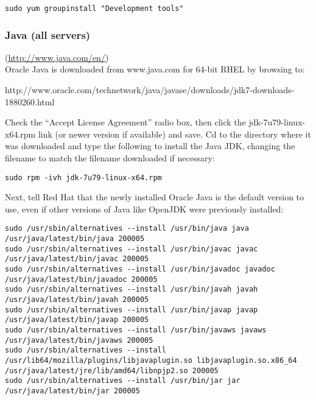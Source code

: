 \begin{verbatim}
sudo yum groupinstall "Development tools"
\end{verbatim}

\subsubsection{Java (all servers)} (\url{http://www.java.com/en/})\\
Oracle Java is downloaded from www.java.com for 64-bit RHEL by browsing to:

http://www.oracle.com/technetwork/java/javase/downloads/jdk7-downloads-1880260.html

Check the ``Accept License Agreement'' radio box, then click the
jdk-7u79-linux-x64.rpm link (or newer version if available) and save.
Cd to the directory where it was downloaded and type the following to install
the Java JDK, changing the filename to match the filename downloaded
if necessary:

\begin{verbatim}
sudo rpm -ivh jdk-7u79-linux-x64.rpm
\end{verbatim}

Next, tell Red Hat that the newly installed Oracle Java is the default
version to use, even if other versions of Java like OpenJDK were
previously installed:

\begin{verbatim}
sudo /usr/sbin/alternatives --install /usr/bin/java java /usr/java/latest/bin/java 200005 
sudo /usr/sbin/alternatives --install /usr/bin/javac javac /usr/java/latest/bin/javac 200005
sudo /usr/sbin/alternatives --install /usr/bin/javadoc javadoc /usr/java/latest/bin/javadoc 200005
sudo /usr/sbin/alternatives --install /usr/bin/javah javah /usr/java/latest/bin/javah 200005 
sudo /usr/sbin/alternatives --install /usr/bin/javap javap /usr/java/latest/bin/javap 200005 
sudo /usr/sbin/alternatives --install /usr/bin/javaws javaws /usr/java/latest/bin/javaws 200005 
sudo /usr/sbin/alternatives --install /usr/lib64/mozilla/plugins/libjavaplugin.so libjavaplugin.so.x86_64 /usr/java/latest/jre/lib/amd64/libnpjp2.so 200005
sudo /usr/sbin/alternatives --install /usr/bin/jar jar /usr/java/latest/bin/jar 200005
\end{verbatim}



